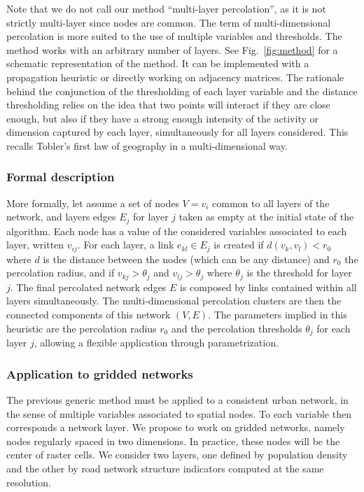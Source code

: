 \documentclass{jimis-en}
\begin{document}
Note that we do not call our method ``multi-layer percolation'', as it is not strictly multi-layer since nodes are common. The term of multi-dimensional percolation is more suited to the use of multiple variables and thresholds. The method works with an arbitrary number of layers. See Fig.~\ref{fig:method} for a schematic representation of the method. It can be implemented with a propagation heuristic or directly working on adjacency matrices. The rationale behind the conjunction of the thresholding of each layer variable and the distance thresholding relies on the idea that two points will interact if they are close enough, but also if they have a strong enough intensity of the activity or dimension captured by each layer, simultaneously for all layers considered. This recalls Tobler's first law of geography \citep{tobler2004first} in a multi-dimensional way.


\subsubsection{Formal description}

More formally, let assume a set of nodes $V = v_i$ common to all layers of the network, and layers edges $E_j$ for layer $j$ taken as empty at the initial state of the algorithm. Each node has a value of the considered variables associated to each layer, written $v_{ij}$. For each layer, a link $e_{kl} \in E_j$ is created if $d(v_k,v_l) < r_0$ where $d$ is the distance between the nodes (which can be any distance) and $r_0$ the percolation radius, and if $v_{kj} > \theta_j$ and $v_{lj} > \theta_j$ where $\theta_j$ is the threshold for layer $j$. The final percolated network edges $E$ is composed by links contained within all layers simultaneously. The multi-dimensional percolation clusters are then the connected components of this network $(V,E)$. The parameters implied in this heuristic are the percolation radius $r_0$ and the percolation thresholds $\theta_j$ for each layer $j$, allowing a flexible application through parametrization.


\subsubsection{Application to gridded networks}

The previous generic method must be applied to a consistent urban network, in the sense of multiple variables associated to spatial nodes. To each variable then corresponds a network layer. We propose to work on gridded networks, namely nodes regularly spaced in two dimensions. In practice, these nodes will be the center of raster cells. We consider two layers, one defined by population density and the other by road network structure indicators computed at the same resolution.
\end{document}
